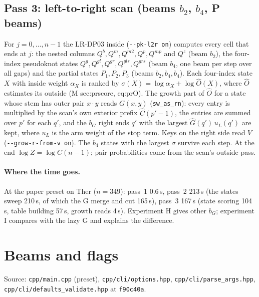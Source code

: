 \documentclass[11pt]{article}
\begin{document}
\subsection*{Pass 3: left-to-right scan (beams $b_2$, $b_4$, P beams)}
For $j=0,\dots,n-1$ the LR-DP03 inside (\texttt{-{}-pk-l2r on}) computes every cell that ends at $j$: the nested columns $Q^b,Q^m,Q^{m2},Q^p,Q^{mp}$ and $Q^z$ (beam $b_2$), the four-index pseudoknot states $Q^g,Q^{gl},Q^{gr},Q^{gls},Q^{grs}$ (beam $b_4$, one beam per step over all gaps) and the partial states $P_1,P_2,P_3$ (beams $b_2,b_4,b_4$). Each four-index state $X$ with inside weight $\alpha_X$ is ranked by $\sigma(X)=\log\alpha_X+\log\hat O(X)$, where $\hat O$ estimates its outside (M sec:prscore, eq:prO). The growth part of $\hat O$ for a state whose stem has outer pair $x\cdot y$ reads $G(x,y)$ (\texttt{sw\_as\_rn}): every entry is multiplied by the scan's own exterior prefix $\hat C(p'-1)$, the entries are summed over $p'$ for each $q'$, and the $b_G$ right ends $q'$ with the largest $\hat G(q')\,u_L(q')$ are kept, where $u_L$ is the arm weight of the stop term. Keys on the right side read $V$ (\texttt{-{}-grow-r-from-v on}). The $b_4$ states with the largest $\sigma$ survive each step. At the end $\log Z=\log C(n-1)$; pair probabilities come from the scan's outside pass.

\paragraph{Where the time goes.} At the paper preset on Ther ($n=349$): pass~1 0.6\,s, pass~2 213\,s (the states sweep 210\,s, of which the G merge and cut 165\,s), pass~3 167\,s (state scoring 104\,s, table building 57\,s, growth reads 4\,s). Experiment H gives other $b_G$; experiment I compares with the lazy G and explains the difference.

\section{Beams and flags}
Source: \texttt{cpp/main.cpp} (preset), \texttt{cpp/cli/options.hpp}, \texttt{cpp/cli/parse\_args.hpp}, \texttt{cpp/cli/defaults\_validate.hpp} at \texttt{f90c40a}.
\end{document}
